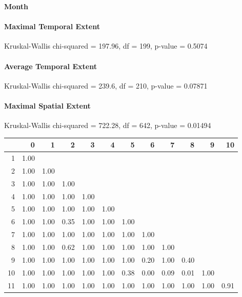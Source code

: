 \large
\centerline{\textbf{Month}}
\normalsize

\paragraph{Maximal Temporal Extent}
Kruskal-Wallis chi-squared = 197.96, df = 199, p-value = 0.5074

\paragraph{Average Temporal Extent}
Kruskal-Wallis chi-squared = 239.6, df = 210, p-value = 0.07871

\paragraph{Maximal Spatial Extent}
Kruskal-Wallis chi-squared = 722.28, df = 642, p-value = 0.01494
\begin{tabular}{rrrrrrrrrrrr}
	\hline
   & 0 & 1 & 2 & 3 & 4 & 5 & 6 & 7 & 8 & 9 & 10 \\ 
	\hline
  1 & 1.00 &  &  &  &  &  &  &  &  &  &  \\ 
	2 & 1.00 & 1.00 &  &  &  &  &  &  &  &  &  \\ 
	3 & 1.00 & 1.00 & 1.00 &  &  &  &  &  &  &  &  \\ 
	4 & 1.00 & 1.00 & 1.00 & 1.00 &  &  &  &  &  &  &  \\ 
	5 & 1.00 & 1.00 & 1.00 & 1.00 & 1.00 &  &  &  &  &  &  \\ 
	6 & 1.00 & 1.00 & 0.35 & 1.00 & 1.00 & 1.00 &  &  &  &  &  \\ 
	7 & 1.00 & 1.00 & 1.00 & 1.00 & 1.00 & 1.00 & 1.00 &  &  &  &  \\ 
	8 & 1.00 & 1.00 & 0.62 & 1.00 & 1.00 & 1.00 & 1.00 & 1.00 &  &  &  \\ 
	9 & 1.00 & 1.00 & 1.00 & 1.00 & 1.00 & 1.00 & 0.20 & 1.00 & 0.40 &  &  \\ 
	10 & 1.00 & 1.00 & 1.00 & 1.00 & 1.00 & 0.38 & 0.00 & 0.09 & 0.01 & 1.00 &  \\ 
	11 & 1.00 & 1.00 & 1.00 & 1.00 & 1.00 & 1.00 & 1.00 & 1.00 & 1.00 & 1.00 & 0.91 \\ 
	 \hline
  \end{tabular}
